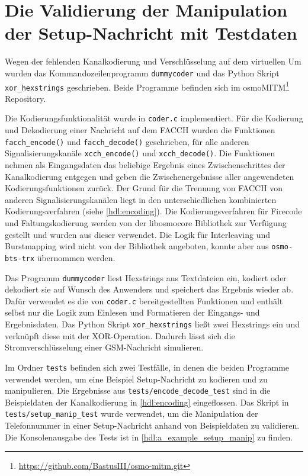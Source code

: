 \section{Die Validierung der Manipulation der Setup-Nachricht mit Testdaten}\label{hdl:coder-impl}

Wegen der fehlenden Kanalkodierung und Verschlüsselung auf dem virtuellen \ac{Um} wurden das Kommandozeilenprogramm \texttt{dummycoder} und das Python Skript \texttt{xor\_hexstrings} geschrieben. Beide Programme befinden sich im osmoMITM\footnote{\url{https://github.com/BastusIII/osmo-mitm.git}} Repository.

Die Kodierungsfunktionalität wurde in \texttt{coder.c} implementiert. Für die Kodierung und Dekodierung einer Nachricht auf dem  \ac{FACCH} wurden die Funktionen \texttt{facch\_encode()} und \texttt{facch\_decode()} geschrieben, für alle anderen Signalisierungskanäle \texttt{xcch\_encode()} und \texttt{xcch\_decode()}. Die Funktionen nehmen als Eingangsdaten das beliebige Ergebnis eines Zwischenschrittes der Kanalkodierung entgegen und geben die Zwischenergebnisse aller angewendeten Kodierungsfunktionen zurück. Der Grund für die Trennung von \ac{FACCH} von anderen Signalisierungskanälen liegt in den unterschiedlichen kombinierten Kodierungsverfahren (siehe \autoref{hdl:encoding}). Die Kodierungsverfahren für Firecode und Faltungskodierung werden von der libosmocore Bibliothek zur Verfügung gestellt und wurden aus dieser verwendet. Die Logik für Interleaving und Burstmapping wird nicht von der Bibliothek angeboten, konnte aber aus \texttt{osmo-bts-trx} übernommen werden.

Das Programm \texttt{dummycoder} liest Hexstrings aus Textdateien ein, kodiert oder dekodiert sie auf Wunsch des Anwenders und speichert das Ergebnis wieder ab. Dafür verwendet es die von \texttt{coder.c} bereitgestellten Funktionen und enthält selbst nur die Logik zum Einlesen und Formatieren der Eingangs- und Ergebnisdaten. Das Python Skript \texttt{xor\_hexstrings} ließt zwei Hexstrings ein und verknüpft diese mit der \ac{XOR}-Operation. Dadurch lässt sich die Stromverschlüsselung einer \ac{GSM}-Nachricht simulieren.

Im Ordner \texttt{tests} befinden sich zwei Testfälle, in denen die beiden Programme verwendet werden, um eine Beispiel Setup-Nachricht zu kodieren und zu manipulieren. Die Ergebnisse aus \texttt{tests/encode\_decode\_test} sind in die Beispieldaten der Kanalkodierung in \autoref{hdl:encoding} eingeflossen. Das Skript in \texttt{tests/setup\_manip\_test} wurde verwendet, um die Manipulation der Telefonnummer in einer Setup-Nachricht anhand von Beispieldaten zu validieren. Die Konsolenausgabe des Tests ist in \autoref{hdl:a_example_setup_manip} zu finden.

